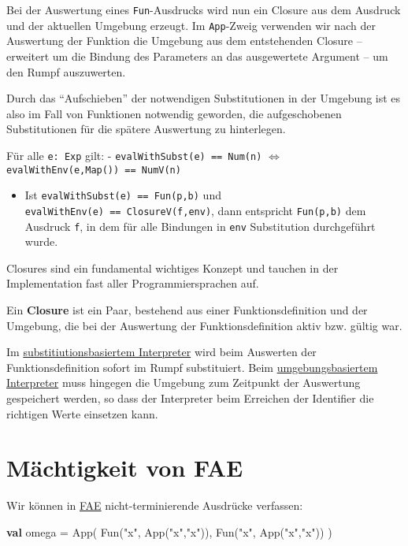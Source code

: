 \documentclass[]{article}
\newenvironment{Shaded}{}{}
\newcommand{\FunctionTok}[1]{\textcolor[rgb]{0.02,0.16,0.49}{#1}}
\newcommand{\KeywordTok}[1]{\textcolor[rgb]{0.00,0.44,0.13}{\textbf{#1}}}
\newcommand{\NormalTok}[1]{#1}
\newcommand{\StringTok}[1]{\textcolor[rgb]{0.25,0.44,0.63}{#1}}
\providecommand{\tightlist}{%
  \setlength{\itemsep}{0pt}\setlength{\parskip}{0pt}}
\begin{document}
Bei der Auswertung eines \texttt{Fun}-Ausdrucks wird nun ein Closure aus
dem Ausdruck und der aktuellen Umgebung erzeugt. Im \texttt{App}-Zweig
verwenden wir nach der Auswertung der Funktion die Umgebung aus dem
entstehenden Closure -- erweitert um die Bindung des Parameters an das
ausgewertete Argument -- um den Rumpf auszuwerten.

Durch das ``Aufschieben'' der notwendigen Substitutionen in der Umgebung
ist es also im Fall von Funktionen notwendig geworden, die
aufgeschobenen Substitutionen für die spätere Auswertung zu hinterlegen.

Für alle \texttt{e:\ Exp} gilt: - \texttt{evalWithSubst(e)\ ==\ Num(n)}
\(\Longleftrightarrow\) \texttt{evalWithEnv(e,Map())\ ==\ NumV(n)}

\begin{itemize}
\tightlist
\item
  Ist \texttt{evalWithSubst(e)\ ==\ Fun(p,b)} und
  \texttt{evalWithEnv(e)\ ==\ ClosureV(f,env)}, dann entspricht
  \texttt{Fun(p,b)} dem Ausdruck \texttt{f}, in dem für alle Bindungen
  in \texttt{env} Substitution durchgeführt wurde.
\end{itemize}

Closures sind ein fundamental wichtiges Konzept und tauchen in der
Implementation fast aller Programmiersprachen auf.

Ein \textbf{Closure} ist ein Paar, bestehend aus einer
Funktionsdefinition und der Umgebung, die bei der Auswertung der
Funktionsdefinition aktiv bzw. gültig war.

Im
\protect\hyperlink{substitutionsbasierter-interpreter-a}{substitiutionsbasiertem
Interpreter} wird beim Auswerten der Funktionsdefinition sofort im Rumpf
substituiert. Beim
\protect\hyperlink{umgebungsbasierter-interpreter-a}{umgebungsbasiertem
Interpreter} muss hingegen die Umgebung zum Zeitpunkt der Auswertung
gespeichert werden, so dass der Interpreter beim Erreichen der
Identifier die richtigen Werte einsetzen kann.

\hypertarget{muxe4chtigkeit-von-fae}{%
\section{Mächtigkeit von FAE}\label{muxe4chtigkeit-von-fae}}

Wir können in \protect\hyperlink{higher-order-funktionen-fae}{FAE}
nicht-terminierende Ausdrücke verfassen:

\begin{Shaded}
\begin{Highlighting}[]
\KeywordTok{val}\NormalTok{ omega = }\FunctionTok{App}\NormalTok{( }\FunctionTok{Fun}\NormalTok{(}\StringTok{"x"}\NormalTok{, }\FunctionTok{App}\NormalTok{(}\StringTok{"x"}\NormalTok{,}\StringTok{"x"}\NormalTok{)), }\FunctionTok{Fun}\NormalTok{(}\StringTok{"x"}\NormalTok{, }\FunctionTok{App}\NormalTok{(}\StringTok{"x"}\NormalTok{,}\StringTok{"x"}\NormalTok{)) )}
\end{Highlighting}
\end{Shaded}
\end{document}
